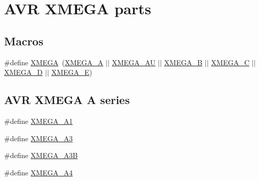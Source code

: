 \hypertarget{group__xmega__part__macros__group}{}\section{A\+VR X\+M\+E\+GA parts}
\label{group__xmega__part__macros__group}
\subsection*{Macros}
\begin{DoxyCompactItemize}
\item 
\#define \mbox{\hyperlink{group__xmega__part__macros__group_ga959bff90afbae437308a52eeb67b3368}{X\+M\+E\+GA}}~(\mbox{\hyperlink{group__xmega__part__macros__group_gab903a90d3a0bc99d7248eaecbb325a23}{X\+M\+E\+G\+A\+\_\+A}} $\vert$$\vert$ \mbox{\hyperlink{group__xmega__part__macros__group_ga55210f3805902072fce76647b50fa177}{X\+M\+E\+G\+A\+\_\+\+AU}} $\vert$$\vert$ \mbox{\hyperlink{group__xmega__part__macros__group_ga62f2c1c93640237425cb64186ddce219}{X\+M\+E\+G\+A\+\_\+B}} $\vert$$\vert$ \mbox{\hyperlink{group__xmega__part__macros__group_ga75b06dd59d29b1de54dd73fe67830973}{X\+M\+E\+G\+A\+\_\+C}} $\vert$$\vert$ \mbox{\hyperlink{group__xmega__part__macros__group_gacc9e4b074c3f87ce7b461483b0beb15c}{X\+M\+E\+G\+A\+\_\+D}} $\vert$$\vert$ \mbox{\hyperlink{group__xmega__part__macros__group_gaab6d2543c5128fca0b1aeecb5c080723}{X\+M\+E\+G\+A\+\_\+E}})
\end{DoxyCompactItemize}
\subsection*{A\+VR X\+M\+E\+GA A series}
\begin{DoxyCompactItemize}
\item 
\#define \mbox{\hyperlink{group__xmega__part__macros__group_gaa0df665226b6faf69dcc137f1b78f074}{X\+M\+E\+G\+A\+\_\+\+A1}}
\item 
\#define \mbox{\hyperlink{group__xmega__part__macros__group_ga831948bd467aa2355eb76ec708d2921a}{X\+M\+E\+G\+A\+\_\+\+A3}}
\item 
\#define \mbox{\hyperlink{group__xmega__part__macros__group_ga32fef354d7f092b04ec41a0733e2c7ae}{X\+M\+E\+G\+A\+\_\+\+A3B}}
\item 
\#define \mbox{\hyperlink{group__xmega__part__macros__group_ga7b83a133489c9896dbdc730615c83be8}{X\+M\+E\+G\+A\+\_\+\+A4}}
\end{DoxyCompactItemize}
